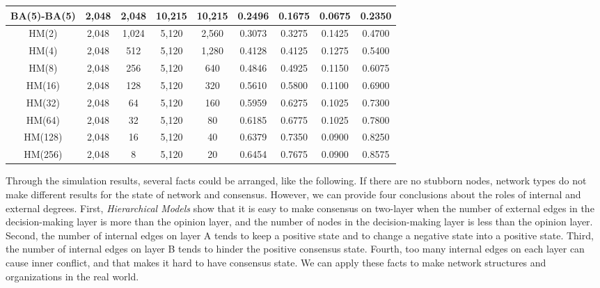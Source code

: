 \begin{table}[!htb]
\begin{center}
\begin{tabular}{c|c|c|c|c|c|c|c|c}
			BA(5)-BA(5)            & 2,048 	& 2,048   & 10,215  & 10,215  &  0.2496   & 0.1675 & 0.0675 & 0.2350   \\ \hline
			HM(2)  				   & 2,048 	& 1,024   & 5,120   & 2,560   &  0.3073   & 0.3275 & 0.1425 & 0.4700   \\ \hline    
			HM(4) 				   & 2,048 	&  512    & 5,120   & 1,280   &  0.4128   & 0.4125 & 0.1275 & 0.5400   \\ \hline
			HM(8)  				   & 2,048 	&  256    & 5,120   & 640     &  0.4846   & 0.4925 & 0.1150 & 0.6075   \\ \hline
			HM(16)				   & 2,048 	&  128    & 5,120   & 320     &  0.5610   & 0.5800 & 0.1100 & 0.6900   \\ \hline
			HM(32) 				   & 2,048 	&   64    & 5,120   & 160     &  0.5959   & 0.6275 & 0.1025 & 0.7300   \\ \hline
			HM(64) 				   & 2,048 	&   32    & 5,120   & 80      &  0.6185   & 0.6775 & 0.1025 & 0.7800   \\ \hline 
			HM(128) 			   & 2,048 	&   16    & 5,120   & 40      &  0.6379   & 0.7350 & 0.0900 & 0.8250   \\ \hline 
			HM(256) 			   & 2,048 	&    8    & 5,120   & 20      &  0.6454   & 0.7675 & 0.0900 & 0.8575   \\ \hline 
			 \hline
		\end{tabular}
	\end{center}
\end{table} 

Through the simulation results, several facts could be arranged, like the following. If there are no stubborn nodes, network types do not make different results for the state of network and consensus. However, we can provide four conclusions about the roles of internal and external degrees. First, \textit{Hierarchical Models} show that it is easy to make consensus on two-layer when the number of external edges in the decision-making layer is more than the opinion layer, and the number of nodes in the decision-making layer is less than the opinion layer. Second, the number of internal edges on layer A tends to keep a positive state and to change a negative state into a positive state. Third, the number of internal edges on layer B tends to hinder the positive consensus state. Fourth, too many internal edges on each layer can cause inner conflict, and that makes it hard to have consensus state. We can apply these facts to make network structures and organizations in the real world. \\

